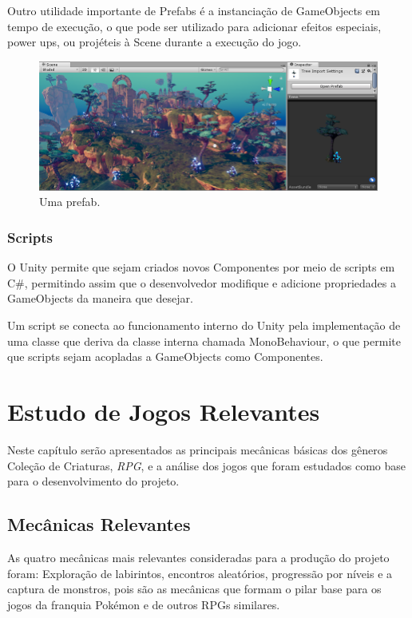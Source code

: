 \documentclass[
	12pt,				%
	openright,			%
	twoside,			%
	a4paper,			%
	english,			%
	french,				%
	spanish,			%
	brazil				%
	]{abntex2}
\begin{document}
	Outro utilidade importante de Prefabs é a instanciação de GameObjects em tempo de execução, o que pode ser utilizado para adicionar efeitos especiais, power ups, ou projéteis à Scene durante a execução do jogo.
\begin{figure}
  \includegraphics[width=\linewidth]{prefab.jpg}
  \caption{Uma prefab.}
  \label{fig:prefab}
\end{figure}	

\subsection{Scripts}

O Unity permite que sejam criados novos Componentes por meio de scripts em C\#, permitindo assim que o desenvolvedor modifique e adicione propriedades a GameObjects da maneira que desejar.

Um script se conecta ao funcionamento interno do Unity pela implementação de uma classe que deriva da classe interna chamada MonoBehaviour, o que permite que scripts sejam acopladas a GameObjects como Componentes.

\chapter{Estudo de Jogos Relevantes}

Neste capítulo serão apresentados as principais mecânicas básicas dos gêneros Coleção de Criaturas, \emph{RPG}, e a análise dos jogos que foram estudados como base para o desenvolvimento do projeto. 


\section{Mecânicas Relevantes}

As quatro mecânicas mais relevantes consideradas para a produção do projeto foram: Exploração de labirintos, encontros aleatórios, progressão por níveis e a captura de monstros, pois são as mecânicas que formam o pilar base para os jogos da franquia Pokémon e de outros RPGs similares.
\end{document}
